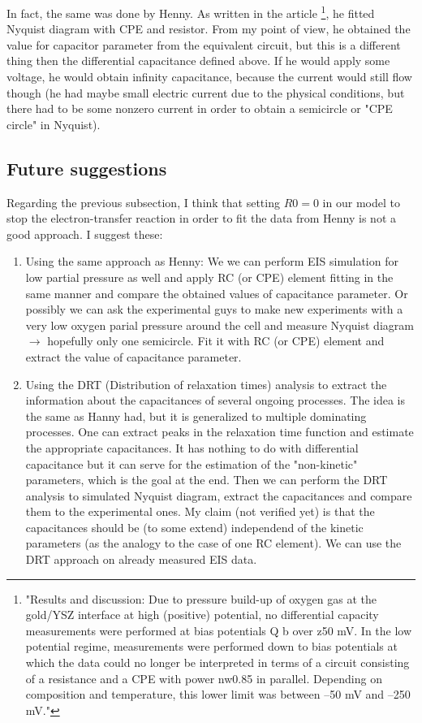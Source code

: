 \documentclass[a4 paper]{article}
\begin{document}
In fact, the same was done by Henny. As written in the article
\footnote{"Results and discussion: Due to pressure build-up of oxygen gas at the gold/YSZ interface at high (positive) potential, no differential capacity
measurements were performed at bias potentials Q b over z50 mV. In the low potential regime, measurements were performed down to bias potentials at which the data could no longer be interpreted in terms of a circuit consisting of a
resistance and a CPE with power nw0.85 in parallel. Depending on composition and temperature, this lower limit was between –50 mV and –250 mV."}, he fitted Nyquist diagram with CPE and resistor. From my point of view, he obtained the value for capacitor parameter from the equivalent circuit, but this is a different thing then the differential capacitance defined above. If he would apply some voltage, he would obtain infinity capacitance, because the current would still flow though (he had maybe small electric current due to the physical conditions, but there had to be some nonzero current in order to obtain a semicircle or "CPE circle" in Nyquist).

\subsection{Future suggestions}
Regarding the previous subsection, I think that setting $R0 = 0$ in our model to stop the electron-transfer reaction in order to fit the data from Henny is not a good approach. I suggest these:
\begin{enumerate}
\item Using the same approach as Henny: We we can perform EIS simulation for low partial pressure as well and apply RC (or CPE) element fitting in the same manner and compare the obtained values of capacitance parameter. Or possibly we can ask the experimental guys to make new experiments with a very low oxygen parial pressure around the cell and measure Nyquist diagram  $\rightarrow$ hopefully only one semicircle. Fit it with RC (or CPE) element and extract the value of capacitance parameter.

\item Using the DRT (Distribution of relaxation times) analysis to extract the information about the capacitances of several ongoing processes. The idea is the same as Hanny had, but it is generalized to multiple dominating processes. One can extract peaks in the relaxation time function and estimate the appropriate capacitances. It has nothing to do with differential capacitance but it can serve for the estimation of the "non-kinetic" parameters, which is the goal at the end. Then we can perform the DRT analysis to simulated Nyquist diagram, extract the capacitances and compare them to the experimental ones. My claim (not verified yet) is that the capacitances should be (to some extend) independend of the kinetic parameters (as the analogy to the case of one RC element). We can use the DRT approach on already measured EIS data.
\end{enumerate}
\end{document}
